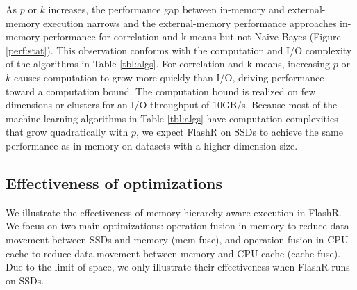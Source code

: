 As $p$ or $k$ increases, the performance gap between
in-memory and external-memory execution narrows and the external-memory
performance approaches in-memory performance for correlation and k-means
but not Naive Bayes (Figure \ref{perf:stat}). This observation conforms with
the computation and I/O complexity of the algorithms in Table \ref{tbl:algs}.
For correlation and k-means, increasing $p$ or $k$ causes computation
to grow more quickly than I/O, driving performance toward a computation bound.
The computation bound is realized on few dimensions or clusters for an I/O throughput
of 10GB/s. Because most of the machine learning algorithms in Table \ref{tbl:algs} have
computation complexities that grow quadratically with $p$, we expect FlashR on SSDs to
achieve the same performance as in memory on datasets with a higher dimension size.


\subsection{Effectiveness of optimizations}
We illustrate the effectiveness of memory hierarchy aware execution in FlashR.
We focus on two main optimizations: operation fusion in memory
to reduce data movement between SSDs and memory (mem-fuse), and
operation fusion in CPU cache to reduce data movement between memory and
CPU cache (cache-fuse). Due to the limit of space, we only illustrate their
effectiveness when FlashR runs on SSDs.

